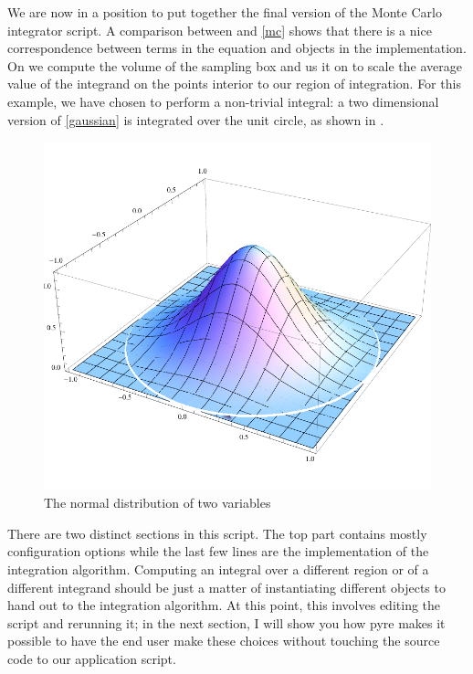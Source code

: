 We are now in a position to put together the final version of the Monte Carlo integrator
script.
%
%
A comparison between  and \eqref{mc} shows that there is a nice
correspondence between terms in the equation and objects in the implementation. On
 we compute the volume of the sampling box and us it on
 to scale the average value of the integrand on the points interior to
our region of integration. For this example, we have chosen to perform a non-trivial integral:
a two dimensional version of \eqref{gaussian} is integrated over the unit circle, as shown in
.
%
\begin{figure}
\centering
\includegraphics[scale=0.60]{figures/gaussian.pdf}
\caption{The normal distribution of two variables\label{fig:gaussian}}
\end{figure}
%
There are two distinct sections in this script. The top part contains mostly configuration
options while the last few lines are the implementation of the integration algorithm. Computing
an integral over a different region or of a different integrand should be just a matter of
instantiating different objects to hand out to the integration algorithm. At this point, this
involves editing the script and rerunning it; in the next section, I will show you how pyre
makes it possible to have the end user make these choices without touching the source code to
our application script.

